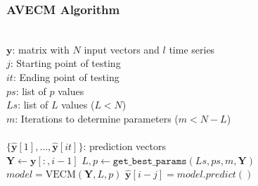 \documentclass{beamer}
\begin{document}
\begin{frame}
\frametitle{AVECM Algorithm}
\small
\begin{algorithmic}[1]
\REQUIRE $\,$ \\
$\mathbf{y}$: matrix with $N$ input vectors and $l$ time series\\
$j$: Starting point of testing \\
$it$: Ending point of testing \\
$ps$: list of $p$ values \\
$Ls$: list of $L$ values ($L<N$) \\
$m$: Iterations to determine parameters ($m < N-L$)\\
\ENSURE  $\,$ \\
$\{ \hat{\mathbf{y}}[1],\dots,\hat{\mathbf{y}}[it]\}$: prediction vectors \\
   \STATE $\mathbf{Y} \gets \mathbf{y}[:,i-1]$
    \STATE $L,p \gets
    \texttt{get\_best\_params}(Ls,ps,m,\mathbf{Y})$
        \STATE $model = \text{VECM}(\mathbf{Y},L, p)$
        \STATE $\hat{\mathbf{y}}[i-j] = model.predict()$
\ENDFOR
\end{algorithmic}
\end{frame}

%
%
\end{document}
